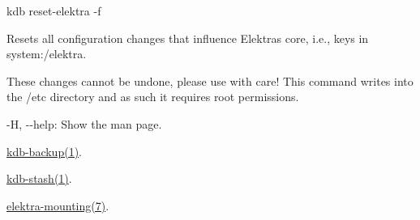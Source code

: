 {\ttfamily kdb reset-\/elektra -\/f}

Resets all configuration changes that influence Elektra\textquotesingle{}s core, i.\+e., keys in {\ttfamily system\+:/elektra}.

These changes cannot be undone, please use with care! This command writes into the {\ttfamily /etc} directory and as such it requires root permissions.


\begin{DoxyItemize}
\item {\ttfamily -\/H}, {\ttfamily -\/-\/help}\+: Show the man page.
\end{DoxyItemize}


\begin{DoxyItemize}
\item \hyperlink{doc_help_kdb-backup_md}{kdb-\/backup(1)}.
\item \hyperlink{doc_help_kdb-stash_md}{kdb-\/stash(1)}.
\item \hyperlink{doc_help_elektra-mounting_md}{elektra-\/mounting(7)}. 
\end{DoxyItemize}